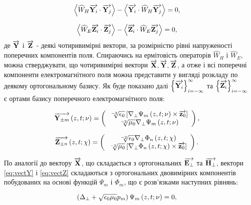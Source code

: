 \begin{equation}
\left< \widehat{W}_H \overrightarrow{\mathbf Y_i} \cdot \overrightarrow{\mathbf Y_j} \right> -
\left< \overrightarrow{\mathbf Y_i} \cdot \widehat{W}_H \overrightarrow{\mathbf Y_j} \right> = 0,
\end{equation}

\begin{equation}
\left< \widehat{W}_E \overrightarrow{\mathbf Z_i} \cdot \overrightarrow{\mathbf Z_j} \right> -
\left< \overrightarrow{\mathbf Z_i} \cdot \widehat{W}_E \overrightarrow{\mathbf Z_j} \right> = 0,
\end{equation}
%
де $ \overrightarrow{\mathbf Y} $ і $ \overrightarrow{\mathbf Z} $ - деякі чотиривимірні вектори, за розмірністю 
рівні напруженості поперечних компонентів поля. Спираючись на ермітовість 
операторів $ \widehat{W}_H $ і $ \widehat{W}_E $, можна стверджувати, що 
чотиривимірні вектори $ \overrightarrow{\mathbf X}, \overrightarrow{\mathbf Y}, \overrightarrow{\mathbf Z} $, а отже і всі поперечні 
компоненти електромагнітного поля можна представити у вигляді розкладу по 
деякому ортогональному базису. Як буде показано далі
$ \left\{ \overrightarrow{\mathbf Y_i} \right\}_{i=-\infty}^\infty $ та 
$ \left\{ \overrightarrow{\mathbf Z_i} \right\}_{i=-\infty}^\infty $ є ортами базису 
поперечного електромагнітного поля:

\begin{equation} \label{eq:vectY}
\overrightarrow{\mathbf Y_{\pm m}} \left( z,t;\nu \right) =
\left( \begin{array}{c} 
\sqrt[-2]{\epsilon_0} 
\left[ \nabla_\perp \Psi_m \left( z,t;\nu \right) \times \overrightarrow{\mathbf z_0} \right] \\ 
\sqrt[-2]{\mu_0} \nabla_\perp \Psi_m \left( z,t;\nu \right) \\ 
\end{array} \right),
\end{equation}

\begin{equation} \label{eq:vectZ}
\overrightarrow{\mathbf Z_{\pm n}} \left( z,t;\chi \right) =
\left( \begin{array}{c} 
\sqrt[-2]{\epsilon_0} \nabla_\perp \Phi_n \left( z,t;\chi \right) \\ 
\sqrt[-2]{\mu_0} \left[ \nabla_\perp \Phi_n \left( z,t;\chi \right) \times \overrightarrow{\mathbf z_0} \right] \\ 
\end{array} \right).
\end{equation}

По аналогії до вектору $ \overrightarrow{\mathbf X} $, що складається з ортогональних 
$ \overrightarrow{\mathbf E_\perp} $ та $ \overrightarrow{\mathbf H_\perp} $, вектори \eqref{eq:vectY} і 
\eqref{eq:vectZ} складаються з ортогональних двовимірних компонентів 
побудованих на основі функцій $ \Psi_m $ і $ \Phi_m $, що є розв'язками
наступних рівнянь:

\begin{equation} \label{eq:equation_psi}
\left( \Delta_\perp + \sqrt{\epsilon_0 \mu_0} p_m \right) 
\Psi_m \left( z,t;\nu \right) = 0,
\end{equation}

